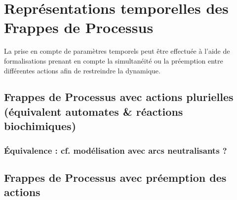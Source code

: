 
\chapter{Représentations temporelles des Frappes de Processus}

La prise en compte de paramètres temporels peut être effectuée à l'aide de
formalisations prenant en compte la simultanéité ou la préemption
entre différentes actions afin de restreindre la dynamique.

\section{Frappes de Processus avec actions plurielles
  (équivalent automates \& réactions biochimiques)}
\subsection{Équivalence : cf. modélisation avec arcs neutralisants ?}

\section{Frappes de Processus avec préemption des actions}




